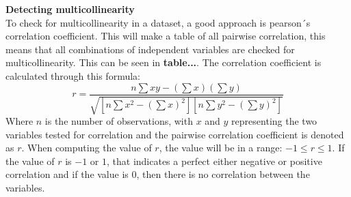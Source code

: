 \noindent \textbf{Detecting multicollinearity}\\
To check for multicollinearity in a dataset, a good approach is pearson´s correlation coefficient. This will make a table of all pairwise correlation, this means that all combinations of independent variables are checked for multicollinearity. This can be seen in \textbf{table...}. The correlation coefficient is calculated through this formula:
$$
r = \frac{n \sum xy - (\sum x)(\sum y)}{\sqrt{[n \sum x^2 - (\sum x)^2][n \sum y^2 - (\sum y)^2]}}
$$
Where $n$ is the number of observations, with $x$ and $y$ representing the two variables tested for correlation and the pairwise correlation coefficient is denoted as $r$. When computing the value of $r$, the value will be in a range: $-1\leq r \leq 1$. If the value of $r$ is $-1$ or $1$, that indicates a perfect either negative or positive correlation and if the value is $0$, then there is no correlation between the variables.






